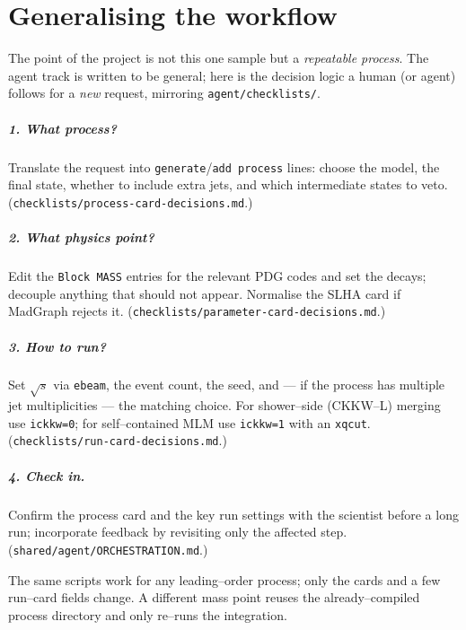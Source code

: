 \documentclass[11pt,oneside]{report}
\newcommand{\code}[1]{\texttt{#1}}
\newcommand{\rts}{\sqrt{s}}
\begin{document}
\chapter{Generalising the workflow}
\label{ch:general}

The point of the project is not this one sample but a \emph{repeatable process}. The agent track is
written to be general; here is the decision logic a human (or agent) follows for a \emph{new}
request, mirroring \code{agent/checklists/}.

\paragraph{1. What process?} Translate the request into \code{generate}/\code{add process} lines:
choose the model, the final state, whether to include extra jets, and which intermediate states to
veto. (\code{checklists/process-card-decisions.md}.)

\paragraph{2. What physics point?} Edit the \code{Block MASS} entries for the relevant PDG codes and
set the decays; decouple anything that should not appear. Normalise the SLHA card if MadGraph
rejects it. (\code{checklists/parameter-card-decisions.md}.)

\paragraph{3. How to run?} Set $\rts$ via \code{ebeam}, the event count, the seed, and --- if the
process has multiple jet multiplicities --- the matching choice. For shower--side (CKKW--L) merging
use \code{ickkw=0}; for self--contained MLM use \code{ickkw=1} with an \code{xqcut}.
(\code{checklists/run-card-decisions.md}.)

\paragraph{4. Check in.} Confirm the process card and the key run settings with the scientist before
a long run; incorporate feedback by revisiting only the affected step. (\code{shared/agent/ORCHESTRATION.md}.)

The same scripts work for any leading--order process; only the cards and a few run--card fields
change. A different mass point reuses the already--compiled process directory and only re--runs the
integration.
\end{document}
